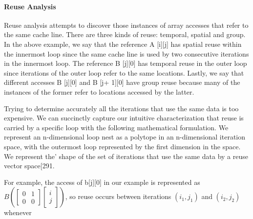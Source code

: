 \paragraph{Reuse Analysis}


Reuse analysis attempts to discover those instances of array accesses
that refer to the same cache line. There are three kinds of reuse:
temporal, spatial and group. In the above example, we say that
the reference A [i][j] has spatial reuse within the innermost loop
since the same cache line is used by two consecutive iterations in
the innermost loop. The reference B [j][0] has temporal reuse in
the outer loop since iterations of the outer loop refer to the same
locations. Lastly, we say that different accesses B [j][0] and
B [j+ 1][0] have group reuse because many of the instances of
the former refer to locations accessed by the latter.

Trying to determine accurately all the iterations that use the same
data is too expensive. We can succinctly capture our intuitive 
characterization that reuse is carried by a specific loop with the following mathematical formulation. We represent an n-dimensional loop
nest as a polytope in an n-dimensional iteration space, with the
outermost loop represented by the first dimension in the space. We
represent the’ shape of the set of iterations that use the same data
by a reuse vector space[291.


For example, the access of b[j][0] in our example is represented 
as \( B\left(\left[\begin{array}{ll}
	0 & 1 \\
	0 & 0
	\end{array}\right]\left[\begin{array}{l}
	i \\
	j
 	\end{array}\right]\right) \), 
so reuse occurs between iterations \((i_1,j_1)\) and \((i_2,j_2)\) 
whenever

